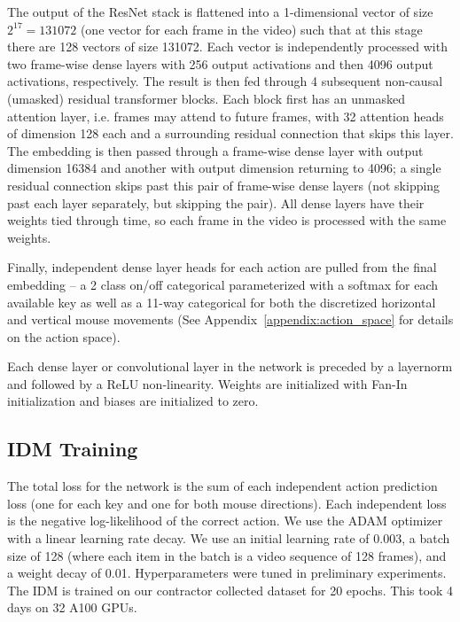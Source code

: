 The output of the ResNet stack is flattened into a 1-dimensional vector of size $2^{17} = 131072$ (one vector for each frame in the video) such that at this stage there are 128 vectors of size 131072. Each vector is independently processed with two frame-wise dense layers with 256 output activations and then 4096 output activations, respectively. The result is then fed through 4 subsequent non-causal (umasked) residual transformer\cite{vaswani2017attention} blocks. Each block first has an unmasked attention layer, i.e. frames may attend to future frames, with 32 attention heads of dimension 128 each and a surrounding residual connection that skips this layer. The embedding is then passed through a frame-wise dense layer with output dimension 16384 and another with output dimension returning to 4096; a single residual connection skips past this pair of frame-wise dense layers (not skipping past each layer separately, but skipping the pair). All dense layers have their weights tied through time, so each frame in the video is processed with the same weights.

Finally, independent dense layer heads for each action are pulled from the final embedding -- a 2 class on/off categorical parameterized with a softmax for each available key as well as a 11-way categorical for both the discretized horizontal and vertical mouse movements (See Appendix~\ref{appendix:action_space} for details on the action space).

Each dense layer or convolutional layer in the network is preceded by a layernorm\cite{ba2016layer} and followed by a ReLU non-linearity. Weights are initialized with Fan-In initialization\cite{lecun2012efficient} and biases are initialized to zero. 

\subsection{IDM Training}
\label{appendix:training_details_IDM_training}
The total loss for the network is the sum of each independent action prediction loss (one for each key and one for both mouse directions). Each independent loss is the negative log-likelihood of the correct action. We use the ADAM\cite{kingma2014adam} optimizer with a linear learning rate decay.
We use an initial learning rate of 0.003, a batch size of 128 (where each item in the batch is a video sequence of 128 frames), and a weight decay of 0.01. 
Hyperparameters were tuned in preliminary experiments. The IDM is trained on our contractor collected dataset for 20 epochs. This took 4 days on 32 A100 GPUs.

